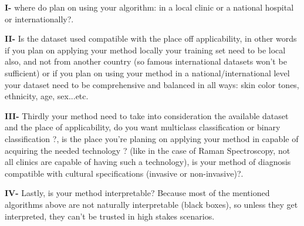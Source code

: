     \textbf{I-} where do plan on using your algorithm: in a local clinic or a national hospital or internationally?.
    
    \textbf{II-} Is the dataset used compatible with the place off applicability, in other words if you plan on applying your method locally your training set need to be local also, and not from another country (so famous international datasets won't be sufficient) or if you plan on using your method in a national/international level your dataset need to be comprehensive and balanced in all ways: skin color tones, ethnicity, age, sex...etc.
    
    \textbf{III-} Thirdly your method need to take into consideration the available dataset and the place of applicability, do you want multiclass classification or binary classification ?, is the place you're planing on applying your method in capable of acquiring the needed technology ? (like in the case of Raman Spectroscopy, not all clinics are capable of having such a technology), is your method of diagnosis compatible with cultural specifications (invasive or non-invasive)?.

    \textbf{IV-} Lastly, is your method interpretable? Because most of the mentioned algorithms above are not naturally interpretable (black boxes), so unless they get interpreted, they can't be trusted in high stakes scenarios.


